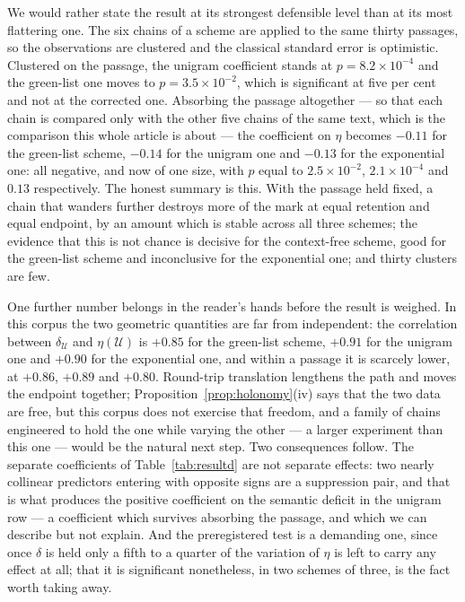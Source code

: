 \documentclass[11pt,a4paper]{article}
\theoremstyle{plain}
\theoremstyle{definition}
\numberwithin{equation}{section}
\newcommand{\Uc}{\mathcal{U}}
\begin{document}
We would rather state the result at its strongest defensible level than
at its most flattering one. The six chains of a scheme are applied to
the same thirty passages, so the observations are clustered and the
classical standard error is optimistic. Clustered on the passage, the
unigram coefficient stands at $p = 8.2\times10^{-4}$ and the green-list
one moves to $p = 3.5\times10^{-2}$, which is significant at five per
cent and not at the corrected one. Absorbing the passage altogether ---
so that each chain is compared only with the other five chains of the
same text, which is the comparison this whole article is about --- the
coefficient on $\eta$ becomes $-0.11$ for the green-list scheme,
$-0.14$ for the unigram one and $-0.13$ for the exponential one: all
negative, and now of one size, with $p$ equal to $2.5\times10^{-2}$,
$2.1\times10^{-4}$ and $0.13$ respectively. The honest summary is this. With the
passage held fixed, a chain that wanders further destroys more of the
mark at equal retention and equal endpoint, by an amount which is stable
across all three schemes; the evidence that this is not chance is
decisive for the context-free scheme, good for the green-list scheme and
inconclusive for the exponential one; and thirty clusters are few.

One further number belongs in the reader's hands before the result is
weighed. In this corpus the two geometric quantities are far from
independent: the correlation between $\delta_\Uc$ and $\eta(\Uc)$ is
$+0.85$ for the green-list scheme, $+0.91$ for the unigram one and
$+0.90$ for the exponential one, and within a passage it is scarcely
lower, at $+0.86$, $+0.89$ and $+0.80$. Round-trip translation
lengthens the path and moves the endpoint together;
Proposition~\ref{prop:holonomy}(iv) says that the two data are free, but
this corpus does not exercise that freedom, and a family of chains
engineered to hold the one while varying the other --- a larger
experiment than this one --- would be the natural next step. Two
consequences follow. The separate coefficients of
Table~\ref{tab:resultd} are not separate effects: two nearly collinear
predictors entering with opposite signs are a suppression pair, and that
is what produces the positive coefficient on the semantic deficit in the
unigram row --- a coefficient which survives absorbing the passage, and
which we can describe but not explain. And the preregistered test is a
demanding one, since once $\delta$ is held only a fifth to a quarter of
the variation of $\eta$ is left to carry any effect at all; that it is
significant nonetheless, in two schemes of three, is the fact worth
taking away.
\end{document}
